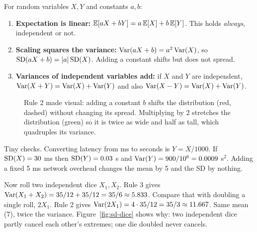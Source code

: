 \begin{theorem}
\label{thm:sd-rules}
For random variables $X,Y$ and constants $a,b$:
\begin{enumerate}
  \item \textbf{Expectation is linear:} $\operatorname{\mathbb{E}}[aX+bY]=a\operatorname{\mathbb{E}}[X]+b\operatorname{\mathbb{E}}[Y]$. This holds
  \emph{always}, independent or not.
  \item \textbf{Scaling squares the variance:} $\operatorname{Var}(aX+b)=a^2\operatorname{Var}(X)$, so
  $\operatorname{SD}(aX+b)=\lvert a\rvert\operatorname{SD}(X)$. Adding a constant shifts but does not spread.
  \item \textbf{Variances of independent variables add:} if $X$ and $Y$ are
  independent, $\operatorname{Var}(X+Y)=\operatorname{Var}(X)+\operatorname{Var}(Y)$ and also
  $\operatorname{Var}(X-Y)=\operatorname{Var}(X)+\operatorname{Var}(Y)$.
\end{enumerate}
\end{theorem}

\begin{figure}[H]
\centering
{}
\caption{Rule 2 made visual: adding a constant $b$ shifts the distribution (red, dashed) without changing its spread. Multiplying by 2 stretches the distribution (green) so it is twice as wide and half as tall, which quadruples its variance.}
\label{fig:sd-shiftscale}
\end{figure}

Tiny checks. Converting latency from ms to seconds is $Y=X/1000$. If
$\operatorname{SD}(X)=30$ ms then $\operatorname{SD}(Y)=0.03$ s and $\operatorname{Var}(Y)=900/10^6=0.0009$ s$^2$. Adding a
fixed 5 ms network overhead changes the mean by 5 and the SD by nothing.

Now roll two independent dice $X_1,X_2$. Rule 3 gives
$\operatorname{Var}(X_1+X_2)=35/12+35/12=35/6\approx 5.833$. Compare that with doubling a single
roll, $2X_1$. Rule 2 gives $\operatorname{Var}(2X_1)=4\cdot 35/12=35/3\approx 11.667$. Same
mean (7), twice the variance. Figure~\ref{fig:sd-dice} shows why: two independent
dice partly cancel each other's extremes; one die doubled never cancels.

